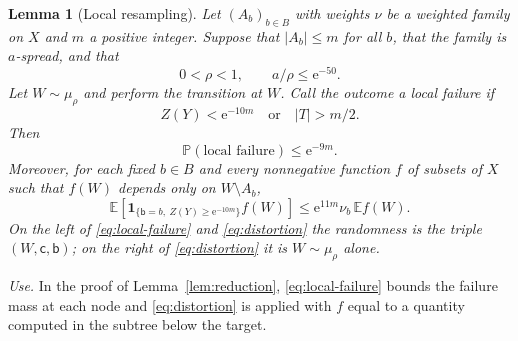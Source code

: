 \documentclass[11pt]{article}
\newtheorem{lemma}[theorem]{Lemma}
\numberwithin{equation}{section}
\newcommand{\PP}{\mathbb P}
\newcommand{\EE}{\mathbb E}
\newcommand{\ind}{\mathbf 1}
\newcommand{\ee}{\mathrm e}
\newcommand{\src}{\mathsf c}
\newcommand{\tgt}{\mathsf b}
\begin{document}
\begin{lemma}[Local resampling]\label{lem:local}
Let $(A_b)_{b\in B}$ with weights $\nu$ be a weighted family on $X$ and
$m$ a positive integer. Suppose that $|A_b|\le m$ for all $b$, that the
family is $a$-spread, and that
\[
 0<\rho<1,\qquad a/\rho\le\ee^{-50}.
\]
Let $W\sim\mu_\rho$ and perform the transition at $W$. Call the outcome
a \emph{local failure} if
\[
 Z(Y)<\ee^{-10m}\quad\text{or}\quad |T|>m/2.
\]
Then
\begin{equation}\label{eq:local-failure}
 \PP(\text{local failure})\le\ee^{-9m}.
\end{equation}
Moreover, for each fixed $b\in B$ and every nonnegative function $f$ of
subsets of $X$ such that $f(W)$ depends only on $W\setminus A_b$,
\begin{equation}\label{eq:distortion}
 \EE\!\left[
  \ind_{\{\tgt=b,\ Z(Y)\ge\ee^{-10m}\}} f(W)
 \right]
 \le \ee^{11m}\nu_b\,\EE f(W).
\end{equation}
On the left of \eqref{eq:local-failure} and \eqref{eq:distortion} the
randomness is the triple $(W,\src,\tgt)$; on the right of
\eqref{eq:distortion} it is $W\sim\mu_\rho$ alone.
\end{lemma}

\emph{Use.} In the proof of Lemma~\ref{lem:reduction},
\eqref{eq:local-failure} bounds the failure mass at each node and
\eqref{eq:distortion} is applied with $f$ equal to a quantity computed
in the subtree below the target.
\end{document}
